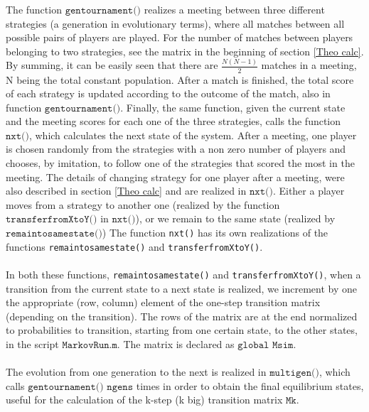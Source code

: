 \documentclass[12pt]{report}
\begin{document}
The function $\texttt{gentournament()}$ realizes  a meeting between three different strategies (a generation in evolutionary terms), where all matches between all possible pairs of players are played. For the number of matches between players belonging to two strategies, see the matrix in the beginning of section \ref{Theo calc}. By summing, it can be easily seen that there are $\frac{N(N-1)}{2}$ matches in a meeting, N being the total constant population. After a match is finished, the total score of each strategy is updated according to the outcome of the match, also in function $\texttt{gentournament()}$. Finally, the same function, given the current state and the meeting scores for each one of the three strategies, calls the function $\texttt{nxt()}$, which calculates the next state of the system. After a meeting, one player is chosen randomly from the strategies with a non zero number of players and chooses, by imitation, to follow one of the strategies that scored the most in the meeting. The details of changing strategy for one player after a meeting, were also described in section \ref{Theo calc} and are realized in $\texttt{nxt()}$. Either a player moves from a strategy to another one (realized by the function $\texttt{transferfromXtoY()}$ in $\texttt{nxt()}$), or we remain to the same state (realized by $\texttt{remaintosamestate()}$) The function \texttt{nxt()} has its own realizations of the functions \texttt{remaintosamestate()} and \texttt{transferfromXtoY()}.
\\\\
In both these functions, \texttt{remaintosamestate()} and \texttt{transferfromXtoY()}, when a transition from the current state to a next state is realized, we increment by one the appropriate (row, column) element of the one-step transition matrix (depending on the transition). The rows of the matrix are at the end normalized to probabilities to transition, starting from one certain state, to the other states, in the script $\texttt{MarkovRun.m}$. The matrix is declared as $\texttt{global Msim}$.
\\\\
The evolution from one generation to the next is realized in $\texttt{multigen()}$, which calls $\texttt{gentournament()}$ $\texttt{ngens}$ times in order to obtain the final equilibrium states, useful for the calculation of the k-step (k big) transition matrix $\texttt{Mk}$.
\end{document}
